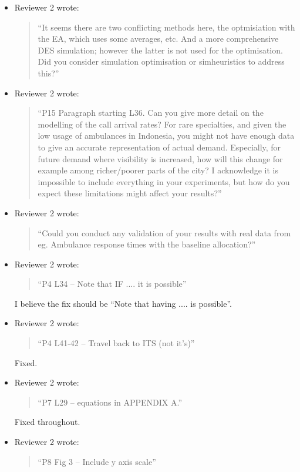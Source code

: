 \documentclass{article}
\begin{document}
\begin{itemize}
\item Reviewer 2 wrote:
\begin{quote}
``It seems there are two conflicting methods here, the optmisiation with the EA, which uses some averages, etc. And a more comprehensive DES simulation; however the latter is not used for the optimisation. Did you consider simulation optimisation or simheuristics to address this?''
\end{quote}

\item Reviewer 2 wrote:
\begin{quote}
``P15 Paragraph starting L36. Can you give more detail on the modelling of the call arrival rates? For rare specialties, and given the low usage of ambulances in Indonesia, you might not have enough data to give an accurate representation of actual demand. Especially, for future demand where visibility is increased, how will this change for example among richer/poorer parts of the city? I acknowledge it is impossible to include everything in your experiments, but how do you expect these limitations might affect your results?''
\end{quote}

\item Reviewer 2 wrote:
\begin{quote}
``Could you conduct any validation of your results with real data from eg. Ambulance response times with the baseline allocation?''
\end{quote}

\item Reviewer 2 wrote:
\begin{quote}
``P4 L34 – Note that IF .... it is possible''
\end{quote}
I believe the fix should be ``Note that having .... is possible''.

\item Reviewer 2 wrote:
\begin{quote}
``P4 L41-42 – Travel back to ITS (not it’s)''
\end{quote}
Fixed.

\item Reviewer 2 wrote:
\begin{quote}
``P7 L29 – equations in APPENDIX A.''
\end{quote}
Fixed throughout.

\item Reviewer 2 wrote:
\begin{quote}
``P8 Fig 3 – Include y axis scale''
\end{quote}


\end{itemize}
\end{document}
